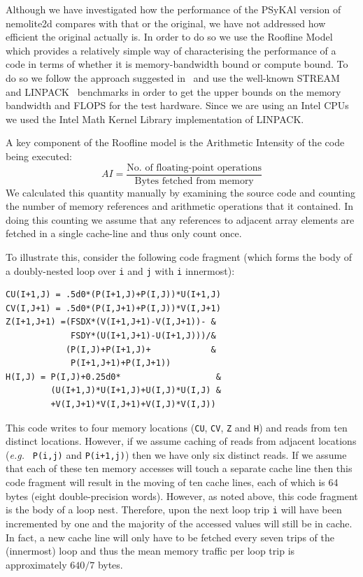 \documentclass[12pt]{article}
\newcommand{\psykal}{{PS}y{KA}l}
\begin{document}
Although we have investigated how the performance of the \psykal
version of nemolite2d compares with that or the original, we have not
addressed how efficient the original actually is. In order to do so we
use the Roofline Model~\cite{roofline} which provides a relatively
simple way of characterising the performance of a code in terms of
whether it is memory-bandwidth bound or compute bound. To do so we
follow the approach suggested in~\cite{para_pearls} and use the
well-known STREAM~\cite{stream} and LINPACK~\cite{linpack} benchmarks
in order to get the upper bounds on the memory bandwidth and FLOPS for
the test hardware. Since we are using an Intel CPUs we used
the Intel Math Kernel Library implementation of LINPACK.

A key component of the Roofline model is the Arithmetic Intensity of
the code being executed:
\begin{equation}
AI = \frac{\textrm{No. of floating-point operations}}{\textrm{Bytes fetched from memory}}
\end{equation}
We calculated this quantity manually by examining the
source code and counting the number of memory references and
arithmetic operations that it contained. In doing this counting we
assume that any references to adjacent array elements are fetched in a
single cache-line and thus only count once.

To illustrate this, consider the following code fragment (which forms
the body of a doubly-nested loop over {\tt i} and {\tt j} with {\tt i}
innermost):
\begin{verbatim}
CU(I+1,J) = .5d0*(P(I+1,J)+P(I,J))*U(I+1,J)
CV(I,J+1) = .5d0*(P(I,J+1)+P(I,J))*V(I,J+1)
Z(I+1,J+1) =(FSDX*(V(I+1,J+1)-V(I,J+1))- &
             FSDY*(U(I+1,J+1)-U(I+1,J)))/&
            (P(I,J)+P(I+1,J)+            &
             P(I+1,J+1)+P(I,J+1))
H(I,J) = P(I,J)+0.25d0*                   &
         (U(I+1,J)*U(I+1,J)+U(I,J)*U(I,J) & 
         +V(I,J+1)*V(I,J+1)+V(I,J)*V(I,J))
\end{verbatim}
This code writes to four memory locations ({\tt CU}, {\tt CV}, {\tt Z}
and {\tt H}) and reads from ten distinct locations.  However, if we
assume caching of reads from adjacent locations ({\it e.g.} {\tt
  P(i,j)} and {\tt P(i+1,j)}) then we have only six distinct reads.
If we assume that each of these ten memory accesses will touch a
separate cache line then this code fragment will result in the moving
of ten cache lines, each of which is 64 bytes (eight double-precision
words). However, as noted above, this code fragment is the body of a
loop nest. Therefore, upon the next loop trip {\tt i} will have been
incremented by one and the majority of the accessed values will still
be in cache. In fact, a new cache line will only have to be fetched
every seven trips of the (innermost) loop and thus the mean memory
traffic per loop trip is approximately $640/7$ bytes.
\end{document}
